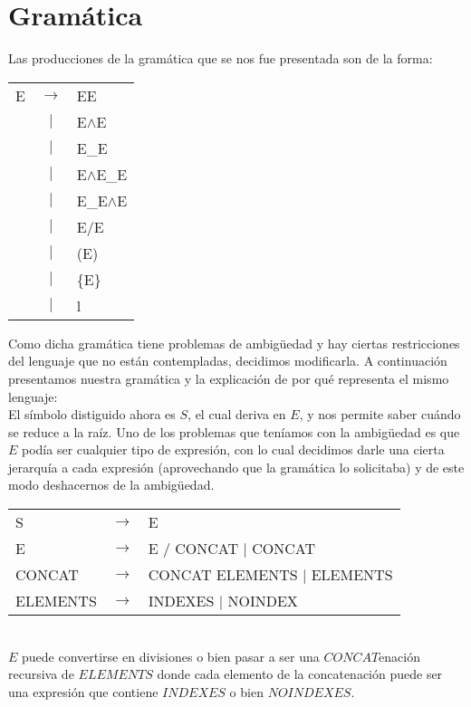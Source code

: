 \section{Gramática}
Las producciones de la gram\'atica que se nos fue presentada son de la forma:\\

\begin{tabular}{ l c l }
    E & $\rightarrow$ & EE \\
    & $|$ & E$\wedge$E \\
    & $|$ & E\_E \\
    & $|$ & E$\wedge$E\_E \\
    & $|$ & E\_E$\wedge$E \\
    & $|$ & E$\slash$E \\
    & $|$ & (E) \\
    & $|$ & \{E\} \\
    & $|$ & l \\
\end{tabular}

Como dicha gram\'atica tiene problemas de ambig\"uedad y hay ciertas restricciones del lenguaje que no est\'an contempladas, decidimos modificarla.
A continuaci\'on presentamos nuestra gram\'atica y la explicaci\'on de por qu\'e representa el mismo lenguaje: \\

El s\'imbolo distiguido ahora es $S$, el cual deriva en $E$, y nos permite saber cu\'ando se reduce a la ra\'iz. Uno de los problemas que ten\'iamos con la ambig\"uedad es que $E$ pod\'ia ser cualquier tipo de expresi\'on, con lo cual decidimos darle una cierta jerarqu\'ia a cada expresi\'on (aprovechando que la gram\'atica lo solicitaba) y de este modo deshacernos de la ambig\"uedad.\\


\begin{tabular}{ l c l }
    S &        $\rightarrow$ & E \\
    E &        $\rightarrow$ & E $\slash$ CONCAT $|$ CONCAT \\
    CONCAT &   $\rightarrow$ & CONCAT ELEMENTS $|$ ELEMENTS \\
    ELEMENTS & $\rightarrow$ & INDEXES $|$ NOINDEX \\
\end{tabular} \\
$E$ puede convertirse en divisiones o bien pasar a ser una $CONCAT$enaci\'on recursiva de $ELEMENTS$ donde cada elemento de la concatenaci\'on
puede ser una expresi\'on que contiene $INDEXES$ o bien $NOINDEXES$.\\

